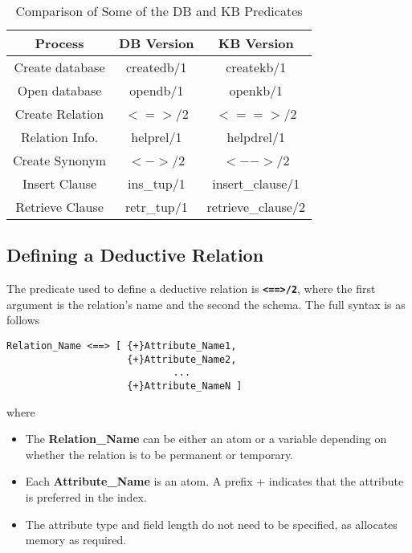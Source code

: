 \begin{table}[h]
\centering
\begin{tabular}{||c|c|c||}        
\hline 
 Process &  DB Version & KB Version \\ \hline
 Create database & createdb/1 & createkb/1   \\
 Open database & opendb/1 & openkb/1   \\ 
 Create Relation & $<=>$/2 & $<==>$/2 \\
 Relation Info. & helprel/1 & helpdrel/1 \\
 Create Synonym &  $<$$-$$>$/2 & $<$$-$$-$$>$/2 \\
 Insert Clause & ins\_tup/1 & insert\_clause/1 \\
 Retrieve Clause &  retr\_tup/1 & retrieve\_clause/2 \\ \hline
\end{tabular}
\caption{ Comparison of Some of the DB and KB Predicates}
\label{comp}
\end{table}

\subsection{Defining a Deductive Relation}
 
The predicate used to define a deductive relation is {\bf \verb+<==>/2+}, where
the first argument is the relation's name and the second the
schema.  The full syntax is as follows 

\begin{verbatim}
Relation_Name <==> [ {+}Attribute_Name1,
                     {+}Attribute_Name2,
                             ...
                     {+}Attribute_NameN ]
\end{verbatim}

where

\begin{itemize}

\item The {\bf Relation\_Name} can be either an atom or a variable
depending on whether the relation is to be permanent or temporary.

\item Each {\bf Attribute\_Name} is an atom. A prefix  
$+$ indicates that the attribute is preferred in the index.

\item The attribute type and field length do not need to be specified,
as \eclipse allocates memory as required. 

\end{itemize}


